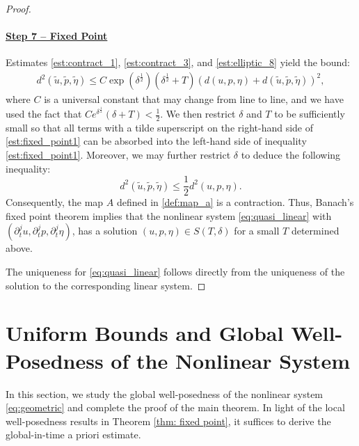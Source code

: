 \documentclass[letterpaper,reqno,10pt,twoside]{amsart}
\theoremstyle{definition}
\theoremstyle{remark}
\def\p{\partial}
\begin{document}
\begin{proof}
			\paragraph{\underline{Step 7 -- Fixed Point}}
			Estimates \eqref{est:contract_1}, \eqref{est:contract_3}, and \eqref{est:elliptic_8} yield the bound:
			\begin{equation}\label{est:fixed_point1}
				\begin{aligned}
					d^{2}(\tilde{u},\tilde{p},\tilde{\eta})\leq {C}\exp(\delta^{\frac{1}{2}})(\delta^{\frac{1}{2}}+T)(d(u,p,\eta)+d(\tilde{u},\tilde{p},\tilde{\eta}))^{2},
				\end{aligned}
			\end{equation}
			where $C$ is a universal constant that may change from line to line, and we have used the fact that $Ce^{\delta^{\frac{1}{2}}}(\delta+T)<\frac12$. We then restrict $\delta$ and $T$ to be sufficiently small so that all terms with a tilde superscript on the right-hand side of \eqref{est:fixed_point1} can be absorbed into the left-hand side of inequality \eqref{est:fixed_point1}.  Moreover, we may further restrict $\delta$ to deduce the following inequality:
			\[
			d^{2}(\tilde{u},\tilde{p},\tilde{\eta})\leq \frac{1}{2}d^{2}(u,p,\eta).
			\]
			Consequently, the map $A$ defined in \eqref{def:map_a} is a contraction. Thus, Banach's fixed point theorem implies that the nonlinear system \eqref{eq:quasi_linear} with $(\p_t^ju, \p_t^jp, \p_t^j\eta)$, has a solution $(u,p,\eta)\in S(T,\delta)$ for a small $T$ determined above.
			
			The uniqueness for \eqref{eq:quasi_linear} follows directly from the uniqueness of the solution to the corresponding linear system.
		\end{proof}
		
		
		\section{Uniform Bounds and Global Well-Posedness of the Nonlinear System}
		
		
		In this section, we study the global well-posedness of the nonlinear system \eqref{eq:geometric} and complete the proof of the main theorem. In light of the local well-posedness results in Theorem \ref{thm: fixed point}, it suffices to derive the global-in-time a priori estimate. 
		
\end{document}

